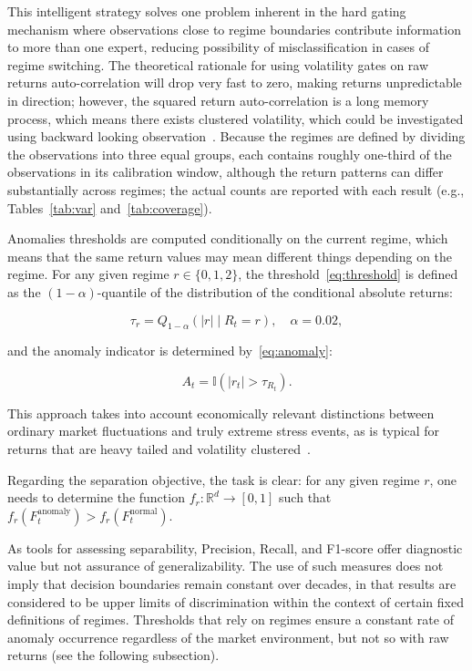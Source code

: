 \documentclass[]{interact}
\begin{document}
This intelligent strategy solves one problem inherent in the hard
gating mechanism where observations close to regime boundaries
contribute information to more than one expert, reducing possibility
of misclassification in cases of regime switching. The theoretical
rationale for using volatility gates on raw returns auto-correlation
will drop very fast to zero, making returns unpredictable in direction;
however, the squared return auto-correlation is a long memory
process, which means there exists clustered volatility, which could
be investigated using backward looking observation~\citep{cont2001empirical}. Because the regimes are defined by dividing the observations into three equal groups, each contains roughly one-third of the observations in its calibration window, although the return patterns can differ substantially across regimes; the actual counts are reported with each result (e.g., Tables~\ref{tab:var} and~\ref{tab:coverage}).

Anomalies thresholds are computed conditionally on
the current regime, which means that the same return values
may mean different things depending on the regime.
For any given regime $r \in \{0,1,2\}$, the threshold~\eqref{eq:threshold}
is defined as the $(1-\alpha)$-quantile of the distribution of the
conditional absolute returns:

\begin{equation}
\tau_r = Q_{1-\alpha}(|r| \mid R_t = r), \quad \alpha = 0.02,
\label{eq:threshold}
\end{equation}

and the anomaly indicator is determined by~\eqref{eq:anomaly}:

\begin{equation}
A_t = \mathbb{I}(|r_t| > \tau_{R_t}).
\label{eq:anomaly}
\end{equation}

This approach takes into account economically relevant distinctions
between ordinary market fluctuations and truly extreme stress
events, as is typical for returns that are heavy tailed and volatility
clustered~\citep{bouchaud2001more}.

Regarding the separation objective, the task is clear:
for any given regime $r$, one needs to determine the function
$f_r : \mathbb{R}^d \rightarrow [0,1]$ such that
$f_r(F_t^{\text{anomaly}}) > f_r(F_t^{\text{normal}})$.

As tools for assessing separability, Precision, Recall, and F1-score offer diagnostic value but not assurance of generalizability. The use of such measures does not imply that decision boundaries remain constant over decades, in that results are considered to be upper limits of discrimination within the context of certain fixed definitions of regimes. Thresholds that rely on regimes ensure a constant rate of anomaly occurrence regardless of the market environment, but not so with raw returns (see the following subsection).
\end{document}

